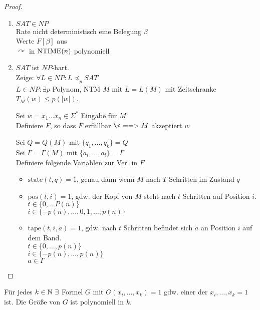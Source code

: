 \begin{proof}\
	\begin{enumerate}
	\item $SAT\in NP$\\
		Rate nicht deterministisch eine Belegung $\beta$\\
		Werte $F[\beta]$ aus\\
		$\curvearrowright$ in $\operatorname{NTIME}(n)$ polynomiell
	\item $SAT$ ist $NP$-hart.\\
		Zeige: $\forall L\in NP : L \preceq_p SAT$\\
		$L\in NP : \exists p$ Polynom, \ac{NTM} $M$ mit $L=L(M)$ mit Zeitschranke $T_M(w)\leq p(|w|)$.
		
		Sei $w = x_1\dots x_n\in\Sigma^*$ Eingabe für $M$.\\
		Definiere $F$, so dass $F$ erfüllbar $\<==> M$ akzeptiert $w$
		
		Sei $Q=Q(M)$ mit $\{q_1,\dots,q_k\}=Q$\\
		Sei $\Gamma = \Gamma(M)$ mit $\{a_i,\dots,a_l\} = \Gamma$\\
		Definiere folgende Variablen zur Ver. in $F$
		\begin{itemize}
		\item $\mathrm{state}(t,q) = 1$, genau dann wenn $M$ nach $T$ Schritten im Zustand $q$
		\item $\mathrm{pos}(t,i) = 1$, gdw. der Kopf von $M$ steht nach $t$ Schritten auf Position $i$.\\
		$t\in\{0,\dots P(n)\}$\\
		$i\in \{-p(n),\dots,0,1,\dots,p(n)\}$
		\item $\mathrm{tape}(t,i,a) = 1$, gdw. nach $t$ Schritten befindet sich $a$ an Position $i$ auf dem Band.\\
		$t\in\{0,\dots,p(n)\}$\\
		$i\in\{-p(n),\dots,p(n)\}$\\
		$a\in\Gamma$ \qedhere
		\end{itemize}
	\end{enumerate}
\end{proof}
\begin{lemma}
	Für jedes $k\in\mathbb{N}\ \exists$ Formel $G$ mit $G(x_i,\dots,x_k)=1$ gdw. einer der $x_i,\dots,x_k = 1$ ist. Die Größe von $G$ ist polynomiell in $k$.
\end{lemma}
